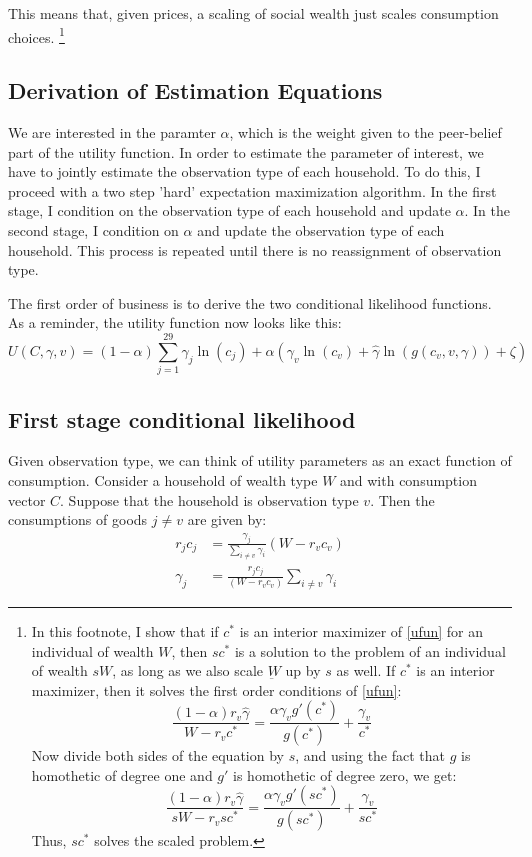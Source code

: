 \documentclass[12pt]{article}
\begin{document}
This means that, given prices, a scaling of social wealth just scales consumption choices.
\footnote{
In this footnote, I show that if $c^*$ is an interior maximizer of \eqref{ufun} for an individual of wealth $W$, then $s c^*$ is a solution to the  problem of an individual of wealth $s W$, as long as we also scale $\underbar{W}$ up by $s$ as well.
If $c^*$ is an interior maximizer, then it solves the first order conditions of \eqref{ufun}:
\[
\frac{(1-\alpha)r_v \hat{\gamma}}{W-r_v c^*} = \frac{\alpha \gamma_v g'(c^*)}{g(c^*)} + \frac{\gamma_v}{c^*}
\]
Now divide both sides of the equation by $s$, and using the fact that $g$ is homothetic of degree one and $g'$ is homothetic of degree zero, we get:
\[
\frac{(1-\alpha)r_v \hat{\gamma}}{s W-r_v s c^*} = \frac{\alpha \gamma_v g'(s c^*)}{g(s c^*)} + \frac{\gamma_v}{s c^*}
\]
Thus, $s c^*$ solves the scaled problem.
}
\subsection{Derivation of Estimation Equations}
We are interested in the paramter $\alpha$, which is the weight given to the peer-belief part of the utility function.  In order to estimate the parameter of interest, we have to jointly estimate the observation type of each household.  To do this, I proceed with a two step 'hard' expectation maximization algorithm.  In the first stage, I condition on the observation type of each household and update $\alpha$.  In the second stage, I condition on $\alpha$ and update the observation type of each household.  This process is repeated until there is no reassignment of observation type.

The first order of business is to derive the two conditional likelihood functions.
As a reminder, the utility function now looks like this:
\begin{equation}
	\label{totuti}
U(C,\gamma,v) = (1-\alpha) \sum_{j=1}^{29}\gamma_j \ln(c_j )  + \alpha \left(\gamma_v \ln(c_v)+ \hat{\gamma}\ln(g(c_v,v,\gamma))  + \zeta \right)
\end{equation}

\subsection{First stage conditional likelihood}

Given observation type, we can think of utility parameters as an exact function of consumption.  Consider a household of wealth type $W$ and with consumption vector $C$.  Suppose that the household is observation type $v$.
Then the consumptions of goods $j\neq v$ are given by:
\begin{align}
	\label{eq:sgd}
	r_jc_j &= \frac{\gamma_j}{\sum_{i\neq v}\gamma_i}  \left(W-  r_v c_v\right)\\
	\label{eq:sgdsol}
	\gamma_j &= \frac{r_j c_j}{\left(W- r_v c_v\right)} \sum_{i\neq v}\gamma_i  
\end{align}
\end{document}
